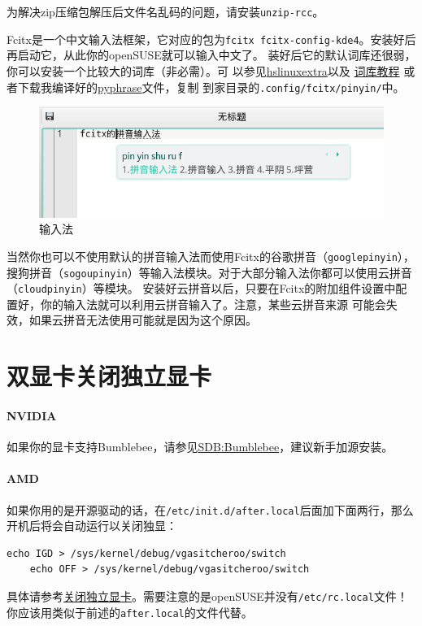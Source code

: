 \documentclass[11pt,openany]{book}
\newcommand{\command}[1]{\texttt{\textcolor{codec}{#1}}}
\newcommand{\soft}[1]{\texttt{\textcolor{dgreen}{#1}}}
\begin{document}
为解决zip压缩包解压后文件名乱码的问题，请安装\soft{unzip-rcc}。

Fcitx是一个中文输入法框架，它对应的包为\soft{fcitx fcitx-config-kde4}。安装好后再启动它，从此你的openSUSE就可以输入中文了。
装好后它的默认词库还很弱，你可以安装一个比较大的词库（非必需）。可%
以参见\href{https://code.google.com/p/hslinuxextra/}{hs\-linux\-extra}以及%
\href{https://www.librehat.com/fcitx-sogou-pinyin-cell-database-convert-import-guide/}{词库教程}%
或者下载我编译好的\href{http://pan.baidu.com/s/1i3HtJ4T}{pyphrase}文件，复制
到家目录的\command{.config/fcitx/pinyin/}中。
\begin{figure}[htbp!]
\centering
\includegraphics[width=\textwidth]{./pic/fcitx.png} 
\caption{输入法}\label{fcitx}
\end{figure}

当然你也可以不使用默认的拼音输入法而使用Fcitx的谷歌拼音（\soft{goo\-gle\-pin\-yin}），
搜狗拼音（\soft{so\-gou\-pin\-yin}）等输入法模块。对于大部分输入法你都可以使用云拼音（\soft{cloud\-pin\-yin}）等模块。
安装好云拼音以后，只要在Fcitx的附加组件设置中配置好，你的输入法就可以利用云拼音输入了。注意，某些云拼音来源
可能会失效，如果云拼音无法使用可能就是因为这个原因。
\section[双显卡]{双显卡关闭独立显卡}
\paragraph{NVIDIA} 如果你的显卡支持Bumblebee，请参见\href{https://zh.opensuse.org/SDB:Bumblebee}{SDB:Bumblebee}，建议新手加源安装。

\paragraph{AMD} 如果你用的是开源驱动的话，在\command{/etc/init.d/after.local}后面加下面两行，那么开机后将会自动运行以关闭独显：
\begin{Verbatim}[formatcom=\color{codec}]
    echo IGD > /sys/kernel/debug/vgasitcheroo/switch
    echo OFF > /sys/kernel/debug/vgasitcheroo/switch    
\end{Verbatim}
具体请参考\href{https://linuxtoy.org/archives/how-to-use-vga-switcheroo-disable-video-card-linux-kms.html}{关闭独立显卡}。需要注意的是openSUSE并没有\command{/etc/rc.local}文件！你应该用类似于前述的\command{after.local}的文件代替。
\end{document}
